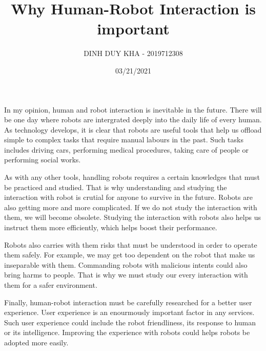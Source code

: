 \documentclass[11pt]{article}
\author{DINH DUY KHA - 2019712308}
\date{03/21/2021}
\title{Why Human-Robot Interaction is important}
\begin{document}
\maketitle
\tableofcontents

In my opinion, human and robot interaction is inevitable in the future. There will be one day where robots are intergrated deeply into the daily life of every human. As technology develops, it is clear that robots are useful tools that help us offload simple to complex tasks that require manual labours in the past. Such tasks includes driving cars, performing medical procedures, taking care of people or performing social works.

As with any other tools, handling robots requires a certain knowledges that must be practiced and studied. That is why understanding and studying the interaction with robot is crutial for anyone to survive in the future. Robots are also getting more and more complicated. If we do not study the interaction with them, we will become obsolete. Studying the interaction with robots also helps us instruct them more efficiently, which helps boost their performance.

Robots also carries with them risks that must be understood in order to operate them safely. For example, we may get too dependent on the robot that make us inseparable with them. Commanding robots with malicious intents could also bring harms to people. That is why we must study our every interaction with them for a safer environment.

Finally, human-robot interaction must be carefully researched for a better user experience. User experience is an enourmously important factor in any services. Such user experience could include the robot friendliness, its response to human or its intelligence. Improving the experience with robots could helps robots be adopted more easily.
\end{document}
